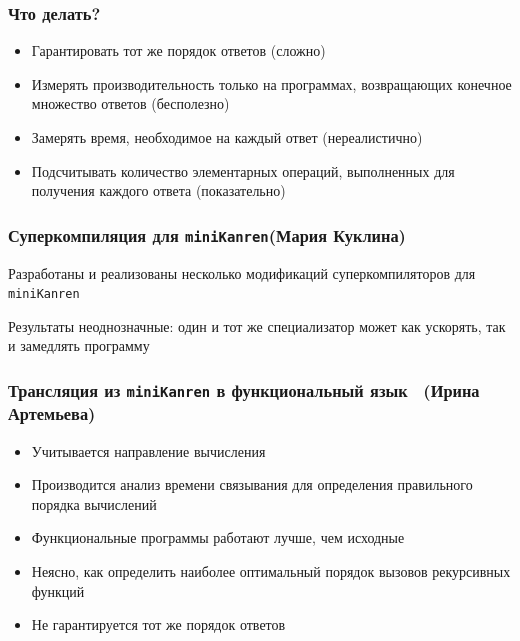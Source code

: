 \documentclass{beamer}
\newcommand{\miniKanren}{\texttt{miniKanren}\xspace}
\begin{document}
\begin{frame}[fragile]
  \frametitle{Что делать?}
  \begin{itemize}
    \item Гарантировать тот же порядок ответов \pause (сложно) \pause
    \item Измерять производительность только на программах, возвращающих конечное множество ответов \pause (бесполезно) \pause
    \item Замерять время, необходимое на каждый ответ \pause (нереалистично) \pause
    \item Подсчитывать количество элементарных операций, выполненных для получения каждого ответа \pause (показательно)
  \end{itemize}
\end{frame}

\begin{frame}[fragile]
  \frametitle{Суперкомпиляция для \miniKanren (Мария Куклина)}
  \begin{center}
    Разработаны и реализованы несколько модификаций суперкомпиляторов для \miniKanren
  \end{center}

  \begin{center}
    Результаты неоднозначные: один и тот же специализатор может как ускорять, так и замедлять программу
  \end{center}
\end{frame}

\begin{frame}[fragile]
  \frametitle{Трансляция из \miniKanren в функциональный язык \ (Ирина Артемьева)}

\begin{itemize}
  \item Учитывается направление вычисления
  \item Производится анализ времени связывания для определения правильного порядка вычислений
\end{itemize}

\begin{itemize}
  \item Функциональные программы работают лучше, чем исходные
  \item Неясно, как определить наиболее оптимальный порядок вызовов рекурсивных функций
  \item Не гарантируется тот же порядок ответов
\end{itemize}

\end{frame}
\end{document}
